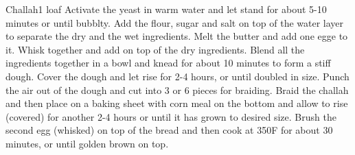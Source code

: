 \begin{recipe}{Challah}{1 loaf}{}
\freeform 
{}
Activate the yeast in warm water and let stand for about 5-10 minutes or until bubblty.
Add the flour, sugar and salt on top of the water layer to separate the dry and the wet ingredients.
Melt the butter and add one egge to it. Whisk together and add on top of the dry ingredients. Blend all the ingredients together in a bowl and knead for about 10 minutes to form a stiff dough. Cover the dough and let rise for 2-4 hours, or until doubled in size. Punch the air out of the dough and cut into 3 or 6 pieces for braiding. Braid the challah and then place on a baking sheet with corn meal on the bottom and allow to rise (covered) for another 2-4 hours or until it has grown to desired size. Brush the second egg (whisked) on top of the bread and then cook at 350F for about 30 minutes, or until golden brown on top.
\end{recipe}
